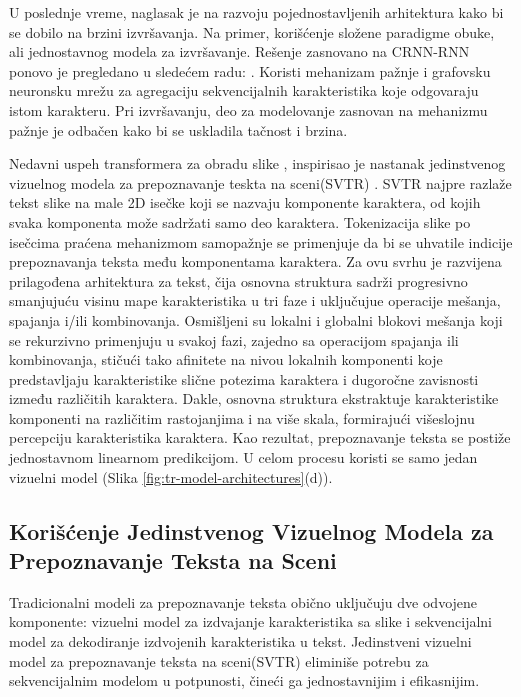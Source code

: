 \documentclass[a4paper,12pt]{article}
\begin{document}
	U poslednje vreme, naglasak je na razvoju pojednostavljenih arhitektura kako bi se dobilo na brzini izvršavanja. Na primer, korišćenje složene paradigme obuke, ali jednostavnog modela za izvršavanje. Rešenje zasnovano na CRNN-RNN ponovo je pregledano u sledećem radu: \cite{Hu_Cai_Hou_Yi_Lin_2020}. Koristi mehanizam pažnje i grafovsku neuronsku mrežu za agregaciju sekvencijalnih karakteristika koje odgovaraju istom karakteru. Pri izvršavanju, deo za modelovanje zasnovan na mehanizmu pažnje je odbačen kako bi se uskladila tačnost i brzina.
	
	Nedavni uspeh transformera za obradu slike \cite{dosovitskiy2021imageworth16x16words, liu2021swintransformerhierarchicalvision}, inspirisao je nastanak jedinstvenog vizuelnog modela za prepoznavanje teskta na sceni(SVTR) \cite{du2022svtrscenetextrecognition}. SVTR najpre razlaže tekst slike na male 2D isečke koji se nazvaju komponente karaktera, od kojih svaka komponenta može sadržati samo deo karaktera. Tokenizacija slike po isečcima praćena mehanizmom samopažnje se primenjuje da bi se uhvatile indicije prepoznavanja teksta među komponentama karaktera. Za ovu svrhu je razvijena prilagođena arhitektura za tekst, čija osnovna struktura sadrži progresivno smanjujuću visinu mape karakteristika u tri faze i uključujue operacije mešanja, spajanja i/ili kombinovanja. Osmišljeni su lokalni i globalni blokovi mešanja koji se rekurzivno primenjuju u svakoj fazi, zajedno sa operacijom spajanja ili kombinovanja, stičući tako afinitete na nivou lokalnih komponenti koje predstavljaju karakteristike slične potezima karaktera i dugoročne zavisnosti između različitih karaktera. Dakle, osnovna struktura ekstraktuje karakteristike komponenti na različitim rastojanjima i na više skala, formirajući višeslojnu percepciju karakteristika karaktera. Kao rezultat, prepoznavanje teksta se postiže jednostavnom linearnom predikcijom. U celom procesu koristi se samo jedan vizuelni model (Slika \ref{fig:tr-model-architectures}(d)).

	\subsection{Korišćenje Jedinstvenog Vizuelnog Modela za Prepoznavanje Teksta na Sceni}
	
	Tradicionalni modeli za prepoznavanje teksta obično uključuju dve odvojene komponente: vizuelni model za izdvajanje karakteristika sa slike i sekvencijalni model za dekodiranje izdvojenih karakteristika u tekst. Jedinstveni vizuelni model za prepoznavanje teksta na sceni(SVTR) eliminiše potrebu za sekvencijalnim modelom u potpunosti, čineći ga jednostavnijim i efikasnijim.
	
\end{document}
